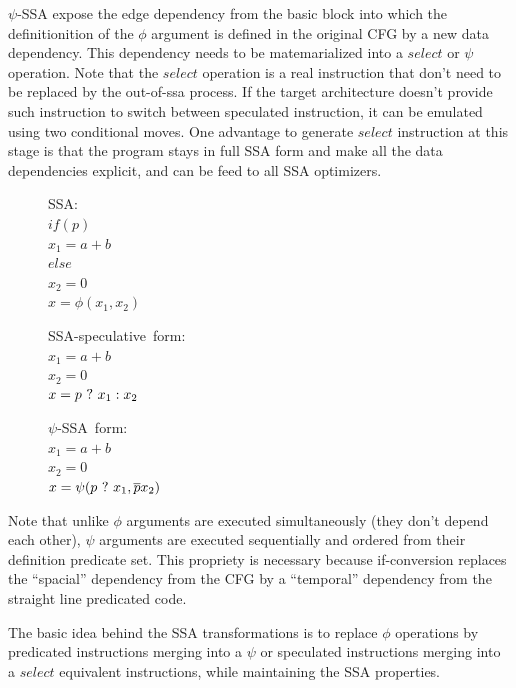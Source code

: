 $\psi$-SSA expose the edge dependency from the basic block into which the definitionition of the $\phi$ argument is defined in the original CFG by a new data dependency. This dependency needs to be matemarialized into a $select$ or $\psi$ operation. Note that the $select$ operation is a real instruction that don't need to be replaced by the out-of-ssa process. If the target architecture doesn't provide such instruction to switch between speculated instruction, it can be emulated using two conditional moves. One advantage to generate $select$ instruction at this stage is that the program stays in full SSA form and make all the data dependencies explicit, and can be feed to all SSA optimizers. 

\begin{figure}
\begin{minipage}[t]{4cm}
\mbox{SSA:} \\
$ if (p) $ \\
$   x_1 = a+b $ \\
$ else $ \\
$   x_2 = 0 $ \\
$ x = \phi (x_1, x_2) $ \\
\end{minipage}
\begin{minipage}[t]{4cm}
\mbox{SSA-speculative form:} \\
$x_1 = a + b $ \\
$x_2 = 0 $ \\
$x = p ~?~  x_1 : x_2$ \\
\end{minipage}
\begin{minipage}[t]{4cm}
\mbox{$\psi$-SSA form:} \\
$x_1 = a + b $ \\
$x_2 = 0 $\\
$x = \psi (p ~?~ x_1, \overline{p} x_2) $ \\
\end{minipage}
\end{figure}

Note that unlike $\phi$ arguments are executed simultaneously (they don't depend each other), $\psi$ arguments are executed sequentially and ordered from their definition predicate set. This propriety is necessary because if-conversion replaces the ``spacial'' dependency from the CFG by a ``temporal'' dependency from the straight line predicated code.

The basic idea behind the SSA transformations is to replace $\phi$ operations by predicated instructions merging into a $\psi$ or speculated instructions merging into a $select$ equivalent instructions, while maintaining the SSA properties.

